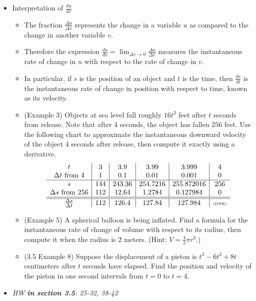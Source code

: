\documentclass[11pt]{article}
\begin{document}
\begin{itemize}
\item Interpretation of \(\frac{du}{dv}\)
  \begin{itemize}
    \item The fraction \(\frac{\Delta u}{\Delta v}\) represents the
    change in a variable \(u\) as compared to the change in another variable \(v\).
    \item Therefore the expression
    \(\frac{du}{dv}=\lim_{\Delta v\to 0}\frac{\Delta u}{\Delta v}\) measures
    the instantaneous rate of change in \(u\) with respect to the rate of
    change in \(v\).
    \item In particular, if \(s\) is the position of an object and
    \(t\) is the time, then \(\frac{ds}{dt}\) is the instantaneous rate of
    change in position with respect to time, known as its velocity.
    \item (Example 3) Objects at sea level fall roughly \(16t^2\) feet after
    \(t\) seconds from release. Note that after \(4\) seconds, the object
    has fallen \(256\) feet. Use the following chart to approximate
    the instantaneous downward velocity of the object \(4\) seconds after
    release, then compute it exactly using a derivative.
    \[
      \begin{array}{c|c|c|c|c|c}
        t & 3 & 3.9 & 3.99 & 3.999 & 4 \\
        \Delta t \text{ from } 4 & 1 & 0.1 & 0.01 & 0.001 & 0 \\\hline
        s & 144 & 243.36 & 254.7216 & 255.872016 & 256 \\
        \Delta s \text{ from } 256 & 112 & 12.64 & 1.2784 & 0.127984 & 0 \\\hline\hline
        \frac{\Delta s}{\Delta t} & 112 & 126.4 & 127.84 & 127.984 & \text{\tiny(DNE)}
      \end{array}
    \]
    \item (Example 5) A spherical balloon is being inflated. Find a formula
    for the instantaneous rate of change of volume with respect to its radius,
    then compute it when the radius is \(2\) meters. (Hint: \(V=\frac{4}{3}\pi r^3\).)
    \item (3.5 Example 8) Suppose the displacement of a piston is \(t^3-6t^2+8t\)
    centimeters after \(t\) seconds have elapsed. Find the position and
    velocity of the piston in one second intervals from \(t=0\) to \(t=4\).
  \end{itemize}

\item\textit{
  HW \textbf{in section 3.5}: 25-32, 38-42
}
\end{itemize}
\end{document}
